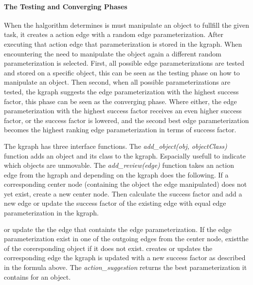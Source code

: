 \paragraph{The Testing and Converging Phases}
When the \ac{halgorithm} determines is must manipulate an object to fullfill the given task, it creates a action edge with a random edge parameterization. After executing that action edge that parameterization is stored in the \ac{kgraph}. When encountering the need to manipulate the object again a different random parameterization is selected. First, all possible edge parameterizations are tested and stored on a specific object, this can be seen as the testing phase on how to manipulate an object. Then second, when all possible parameterizations are tested, the \ac{kgraph} suggests the edge parameterization with the highest success factor, this phase can be seen as the converging phase. Where either, the edge parameterization with the highest success factor receives an even higher success factor, or the success factor is lowered, and the second best edge parameterization becomes the highest ranking edge parameterization in terms of success factor.\bs

The \ac{kgraph} has three interface functions. The \textit{add\_object(\gls{obj}, \gls{objectClass})} function adds an object and its class to the \ac{kgraph}. Espacially usefull to indicate which objects are unmovable. The \textit{add\_review(\gls{edge})} function takes an action edge from the \ac{hgraph} and depending on the \ac{kgraph} does the following. If a corresponding center node (containing the object the edge manipulated) does not yet exist, create a new center node. Then calculate the success factor and add a new edge or update the success factor of the existing edge with equal edge parameterization in the \ac{kgraph}.  


or update the the edge that containts the edge parameterization. If the edge parameterization exist in one of the outgoing edges from the center node, existthe of the corersponding object if it does not exist. 
creates or updates the corresponding edge  the \ac{kgraph} is updated with a new success factor as described in the formula above. The \textit{action\_suggestion} returns the best parameterization it contains for an object.\bs
